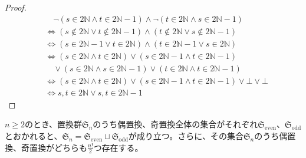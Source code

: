 \documentclass[dvipdfmx]{jsarticle}
\begin{document}
\begin{proof}
\begin{align*}
&\quad \neg\left( s \in 2\mathbb{N} \land t \in 2\mathbb{N} - 1 \right) \land \neg\left( t \in 2\mathbb{N} \land s \in 2\mathbb{N} - 1 \right)\\
&\Leftrightarrow \left( s \notin 2\mathbb{N} \vee t \notin 2\mathbb{N} - 1 \right) \land \left( t \notin 2\mathbb{N} \vee s \notin 2\mathbb{N} - 1 \right)\\
&\Leftrightarrow \left( s \in 2\mathbb{N} - 1 \vee t \in 2\mathbb{N} \right) \land \left( t \in 2\mathbb{N} - 1 \vee s \in 2\mathbb{N} \right)\\
&\Leftrightarrow \left( s \in 2\mathbb{N} \land t \in 2\mathbb{N} \right) \vee \left( s \in 2\mathbb{N} - 1 \land t \in 2\mathbb{N} - 1 \right) \\
&\quad \vee \left( s \in 2\mathbb{N} \land s \in 2\mathbb{N} - 1 \right) \vee \left( t \in 2\mathbb{N} \land t \in 2\mathbb{N} - 1 \right)\\
&\Leftrightarrow \left( s \in 2\mathbb{N} \land t \in 2\mathbb{N} \right) \vee \left( s \in 2\mathbb{N} - 1 \land t \in 2\mathbb{N} - 1 \right) \vee \bot \vee \bot\\
&\Leftrightarrow s,t \in 2\mathbb{N} \vee s,t \in 2\mathbb{N} - 1
\end{align*}
\end{proof}
\begin{thm}\label{2.1.10.6}
$n \geq 2$のとき、置換群$\mathfrak{S}_{n}$のうち偶置換、奇置換全体の集合がそれぞれ$\mathfrak{S}_{\mathrm{even}}$、$\mathfrak{S}_{\mathrm{odd}}$とおかれると、$\mathfrak{S}_{n} = \mathfrak{S}_{\mathrm{even}} \sqcup \mathfrak{S}_{\mathrm{odd}}$が成り立つ。さらに、その集合$\mathfrak{S}_{n}$のうち偶置換、奇置換がどちらも$\frac{n!}{2}$つ存在する。
\end{thm}
\end{document}
